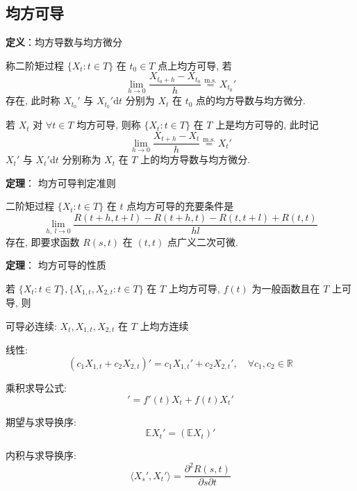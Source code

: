 \documentclass[openany]{ctexbook}
\theoremstyle{kaiti}
\theoremstyle{normal}
\begin{document}
\subsection{均方可导}

\textbf{定义}：均方导数与均方微分

称二阶矩过程 $\{X_t:t\in T\}$ 在 $t_0\in T$ 点上均方可导, 若
\begin{equation}
  \lim_{h\to0}\frac{X_{t_0+h}-X_{t_0}}{h}\overset{\mathrm{m.s.}}{=}X_{t_0}'
\end{equation}
存在, 此时称 $X_{t_0}'$ 与 $X_{t_0}'\mathrm{d}t$ 分别为 $X_t$ 在 $t_0$ 点的均方导数与均方微分.

若 $X_t$ 对 $\forall t\in T$ 均方可导, 则称 $\{X_t:t\in T\}$ 在 $T$ 上是均方可导的, 此时记
\begin{equation}
  \lim_{h\to0}\frac{X_{t+h}-X_{t}}{h}\overset{\mathrm{m.s.}}{=}X_{t}'
\end{equation}
 $X_{t}'$ 与 $X_{t}'\mathrm{d}t$ 分别称为 $X_t$ 在 $T$ 上的均方导数与均方微分.

\textbf{定理}： 均方可导判定准则

二阶矩过程 $\{X_t:t\in T\}$ 在 $t$ 点均方可导的充要条件是
\begin{equation}
  \lim_{h,~l\to0}\frac{R(t+h,t+l)-R(t+h,t)-R(t,t+l)+R(t,t)}{hl}
\end{equation}
存在, 即要求函数 $R(s,t)$ 在 $(t,t)$ 点广义二次可微.

\textbf{定理}： 均方可导的性质

若 $\{X_t:t\in T\},\{X_{1,t},X_{2,t}:t\in T\}$ 在 $T$ 上均方可导, $f(t)$ 为一般函数且在 $T$ 上可导, 则

可导必连续: $X_t,X_{1,t},X_{2,t}$ 在 $T$ 上均方连续

线性:
\begin{equation}
  (c_1X_{1,t}+c_2X_{2,t})'=c_1X_{1,t}'+c_2X_{2,t}',\quad\forall c_1,c_2\in\mathbb{R}
\end{equation}

乘积求导公式:
\begin{equation}
  [f(t)X_t]'=f'(t)X_t+f(t)X_t'
\end{equation}

期望与求导换序:
\begin{equation}
  \mathbb{E}X_t'=(\mathbb{E}X_t)'
\end{equation}

内积与求导换序:
\begin{equation}
  \langle X_s',X_t'\rangle=\frac{\partial^2R(s,t)}{\partial s\partial t}
\end{equation}
\end{document}
